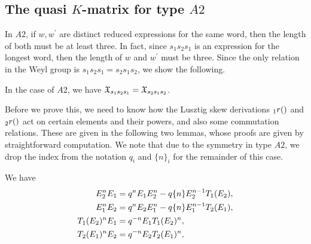 \documentclass[a4 paper, 10pt]{article}
\begin{document}
\subsection{The quasi $K$-matrix for type $A2$}
In $A2$, if $w, w^{\prime}$ are distinct reduced expressions for the same word, then the length of both must be at least three. In fact, since $s_1s_2s_1$ is an expression for the longest word, then the length of $w$ and $w^{\prime}$ must be three. Since the only relation in the Weyl group is $s_1s_2s_1 = s_2s_1s_2$, we show the following. 

\begin{proposition} \label{rk2A2}
	In the case of $A2$, we have $\mathfrak{X}_{s_1s_2s_1} = \mathfrak{X}_{s_2s_1s_2}$.
\end{proposition}

Before we prove this, we need to know how the Lusztig skew derivations ${}_{1}r()$ and ${}_{2}r()$ act on certain elements and their powers, and also some commutation relations. These are given in the following two lemmas, whose proofs are given by straightforward computation. We note that due to the symmetry in type $A2$, we drop the index from the notation $q_i$ and $\{ n \}_i$ for the remainder of this case.

\begin{lemma} \label{A2comm}
	We have
		\begin{align*}
			E_2^n E_1 &= q^n E_1 E_2^n - q\{ n \} E_2^{n-1} T_{1}(E_2),\\
			E_1^n E_2 &= q^n E_2 E_1^n - q\{ n \} E_1^{n-1} T_{2}(E_1),\\
			T_{1}(E_2)^n E_1 &= q^{-n} E_1 T_{1}(E_2)^n,\\
			T_{2}(E_1)^n E_2 &= q^{-n} E_2 T_{2}(E_1)^n,\\
		\end{align*}
\end{lemma}
\end{document}
